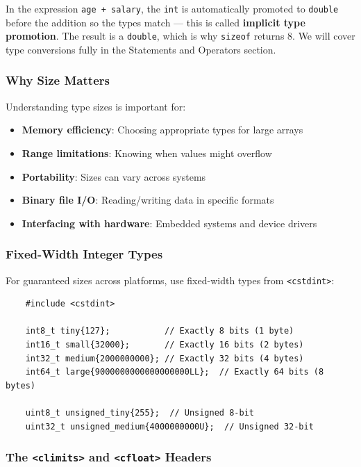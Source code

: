 \begin{remark}
	In the expression \texttt{age + salary}, the \texttt{int} is automatically promoted to \texttt{double} before the addition so the types match — this is called \textbf{implicit type promotion}. The result is a \texttt{double}, which is why \texttt{sizeof} returns 8. We will cover type conversions fully in the Statements and Operators section.
\end{remark}

\subsubsection{Why Size Matters}

Understanding type sizes is important for:
\begin{itemize}
	\item \textbf{Memory efficiency}: Choosing appropriate types for large arrays
	\item \textbf{Range limitations}: Knowing when values might overflow
	\item \textbf{Portability}: Sizes can vary across systems
	\item \textbf{Binary file I/O}: Reading/writing data in specific formats
	\item \textbf{Interfacing with hardware}: Embedded systems and device drivers
\end{itemize}

\subsubsection{Fixed-Width Integer Types}

For guaranteed sizes across platforms, use fixed-width types from \texttt{<cstdint>}:

\begin{lstlisting}
	#include <cstdint>
	
	int8_t tiny{127};           // Exactly 8 bits (1 byte)
	int16_t small{32000};       // Exactly 16 bits (2 bytes)
	int32_t medium{2000000000}; // Exactly 32 bits (4 bytes)
	int64_t large{9000000000000000000LL};  // Exactly 64 bits (8 bytes)
	
	uint8_t unsigned_tiny{255};  // Unsigned 8-bit
	uint32_t unsigned_medium{4000000000U};  // Unsigned 32-bit
\end{lstlisting}

\subsubsection{The \texttt{<climits>} and \texttt{<cfloat>} Headers}

